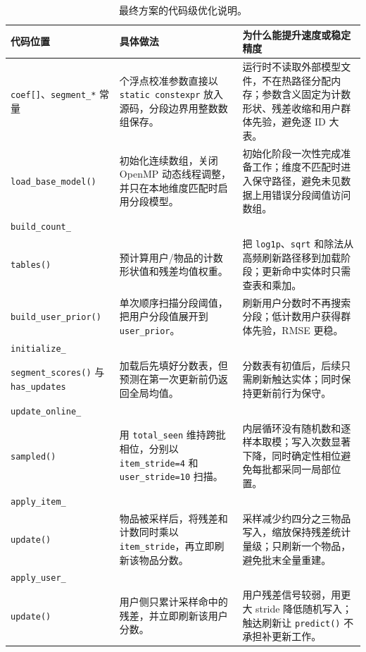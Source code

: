 \documentclass[UTF8,zihao=-4,scheme=plain]{ctexart}
\begin{document}
\begin{table}[H]
  \centering
  \caption{最终方案的代码级优化说明。}
  \label{tab:codepath}
  \scriptsize
  \setlength{\tabcolsep}{3.2pt}
  \begin{tabular}{>{\raggedright\arraybackslash}p{2.55cm}>{\raggedright\arraybackslash}p{4.45cm}>{\raggedright\arraybackslash}p{6.15cm}}
    \toprule
    代码位置 & 具体做法 & 为什么能提升速度或稳定精度\\
    \midrule
    \texttt{coef[]}、\texttt{segment\_*} 常量 & 128 个浮点校准参数直接以 \texttt{static constexpr} 放入源码，分段边界用整数数组保存。 & 运行时不读取外部模型文件，不在热路径分配内存；参数含义固定为计数形状、残差收缩和用户群体先验，避免逐 ID 大表。\\
    \texttt{load\_base\_model()} & 初始化连续数组，关闭 OpenMP 动态线程调整，并只在本地维度匹配时启用分段模型。 & 初始化阶段一次性完成准备工作；维度不匹配时进入保守路径，避免未见数据上用错误分段阈值访问数组。\\
    \texttt{build\_count\_}\\\texttt{tables()} & 预计算用户/物品的计数形状值和残差均值权重。 & 把 \texttt{log1p}、\texttt{sqrt} 和除法从高频刷新路径移到加载阶段；更新命中实体时只需查表和乘加。\\
    \texttt{build\_user\_prior()} & 单次顺序扫描分段阈值，把用户分段值展开到 \texttt{user\_prior}。 & 刷新用户分数时不再搜索分段；低计数用户获得群体先验，RMSE 更稳。\\
    \texttt{initialize\_}\\\texttt{segment\_scores()} 与 \texttt{has\_updates} & 加载后先填好分数表，但预测在第一次更新前仍返回全局均值。 & 分数表有初值后，后续只需刷新触达实体；同时保持更新前行为保守。\\
    \texttt{update\_online\_}\\\texttt{sampled()} & 用 \texttt{total\_seen} 维持跨批相位，分别以 \texttt{item\_stride=4} 和 \texttt{user\_stride=10} 扫描。 & 内层循环没有随机数和逐样本取模；写入次数显著下降，同时确定性相位避免每批都采同一局部位置。\\
    \texttt{apply\_item\_}\\\texttt{update()} & 物品被采样后，将残差和计数同时乘以 \texttt{item\_stride}，再立即刷新该物品分数。 & 采样减少约四分之三物品写入，缩放保持残差统计量级；只刷新一个物品，避免批末全量重建。\\
    \texttt{apply\_user\_}\\\texttt{update()} & 用户侧只累计采样命中的残差，并立即刷新该用户分数。 & 用户残差信号较弱，用更大 stride 降低随机写入；触达刷新让 \texttt{predict()} 不承担补更新工作。\\

\end{tabular}
\end{table}
\end{document}
